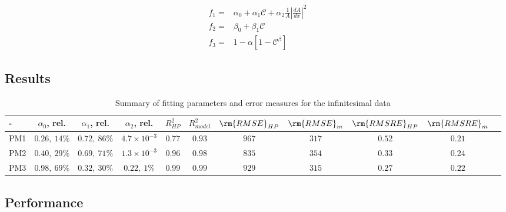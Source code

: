 \documentclass[draft,jgrga]{agutexSI2019}
\begin{document}
\begin{article}
\begin{eqnarray}
	f_1 = & \alpha_0+\alpha_1\mathcal{C} + \alpha_2 \frac{1}{A}\left|\frac{d A}{d x}\right|^2\\
	f_2 = & \beta_0+\beta_1\mathcal{C}\\
	f_3 = &1-\alpha\left[1-\mathcal{C}^{\beta}\right] 
\end{eqnarray}
\subsection{Results}

\begin{table}[htbp!]
\caption{Summary of fitting parameters and error measures for the infinitesimal data}
\begin{tabular}{l|c|c|c|c|c|c|c|c|c|c}
- & $\alpha_0$, rel. & $\alpha_1$, rel. & $\alpha_2$, rel. &$R^2_{HP}$ &$R^2_{model}$ &$\rm{RMSE}_{HP}$ &$\rm{RMSE}_{m}$ & $\rm{RMSRE}_{HP}$ & $\rm{RMSRE}_{m}$ \\
\hline
PM1 	& $0.26,~14\%$ 	& $0.72,~86\%$ 	& $4.7\times 10^{-3}$ 	& $0.77$ 	& $0.93$ & $967$ & $317$ & $0.52$ & $0.21$ \\
PM2 	& $0.40,~29\%$ 	& $0.69,~71\%$ 	& $1.3 \times 10^{-3}$ 	& $0.96$	& $0.98$ & $835$ & $354$ & $0.33$ & $0.24$\\
PM3 	& $0.98,~69\%$ 	& $0.32,~30\%$ 	& $0.22,~1\%$ 			& $0.99$	& $0.99$ & $929$ & $315$ & $0.27$ & $0.22$\\
\end{tabular}
\label{tab:rmse_infi}

\end{table}



\subsection{Performance}



\end{article}
\end{document}
